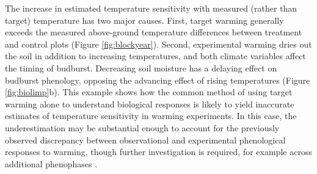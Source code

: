 \documentclass{article}
\begin{document}
\par The increase in estimated temperature sensitivity with measured (rather than target) temperature has two major causes. First, target warming generally exceeds the measured above-ground temperature differences between treatment and control plots (Figure \ref{fig:blockyear}). Second, experimental warming dries out the soil in addition to increasing temperatures, and both climate variables affect the timing of budburst. %
Decreasing soil moisture has a delaying effect on budburst phenology, opposing the advancing effect of rising temperatures (Figure \ref{fig:biolimp}b). This example shows how the common method of using target warming alone to understand biological responses is likely to yield inaccurate estimates of temperature sensitivity in warming experiments. In this case, the underestimation may be substantial enough to account for the previously observed discrepancy between observational and experimental phenological responses to warming, though further investigation is required, for example across additional phenophases \citep{wolkovich2012}. 
\end{document}
